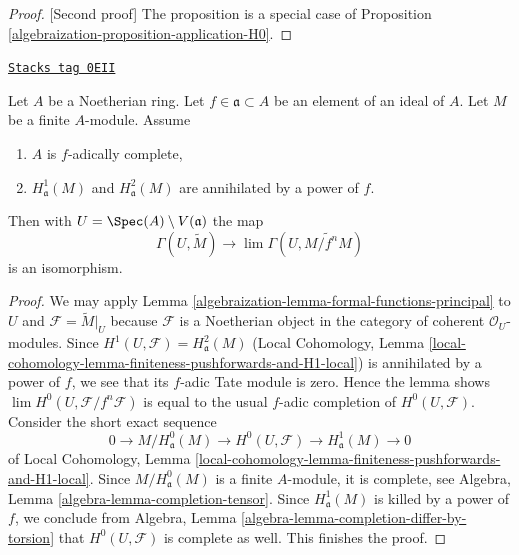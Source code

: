 \begin{proof}
[Second proof]
The proposition is a special case of
Proposition \ref{algebraization-proposition-application-H0}.
\end{proof}

\begin{lemma}[Alternative H0]
\label{algebraization-lemma-alternative-H0}
\href{https://stacks.math.columbia.edu/tag/0EII}{\texttt{Stacks tag 0EII}}

Let $A$ be a Noetherian ring. Let $f \in \mathfrak a \subset A$
be an element of an ideal of $A$. Let $M$ be a finite $A$-module.
Assume
\begin{enumerate}
\item $A$ is $f$-adically complete,
\item $H^1_\mathfrak a(M)$ and $H^2_\mathfrak a(M)$ are
annihilated by a power of $f$.
\end{enumerate}
Then with $U = \Spec(A) \setminus V(\mathfrak a)$ the map
$$
\Gamma(U, \widetilde{M})
\longrightarrow
\lim \Gamma(U, \widetilde{M/f^nM})
$$
is an isomorphism.
\end{lemma}

\begin{proof}

We may apply Lemma \ref{algebraization-lemma-formal-functions-principal} to $U$ and
$\mathcal{F} = \widetilde{M}|_U$ because $\mathcal{F}$ is a Noetherian object in
the category of coherent $\mathcal{O}_U$-modules.
Since $H^1(U, \mathcal{F}) = H^2_\mathfrak a(M)$
(Local Cohomology, Lemma
\ref{local-cohomology-lemma-finiteness-pushforwards-and-H1-local})
is annihilated by a power of $f$, we see that
its $f$-adic Tate module is zero.
Hence the lemma shows $\lim H^0(U, \mathcal{F}/f^n \mathcal{F})$
is equal to the usual $f$-adic completion of $H^0(U, \mathcal{F})$.
Consider the short exact sequence
$$
0 \to M/H^0_\mathfrak a(M) \to H^0(U, \mathcal{F}) \to H^1_\mathfrak a(M) \to 0
$$
of Local Cohomology, Lemma
\ref{local-cohomology-lemma-finiteness-pushforwards-and-H1-local}.
Since $M/H^0_\mathfrak a(M)$ is a finite $A$-module, it is
complete, see Algebra, Lemma \ref{algebra-lemma-completion-tensor}.
Since $H^1_\mathfrak a(M)$ is killed by a power of $f$, we conclude
from Algebra, Lemma \ref{algebra-lemma-completion-differ-by-torsion}
that $H^0(U, \mathcal{F})$ is complete as well. This finishes the proof.
\end{proof}

